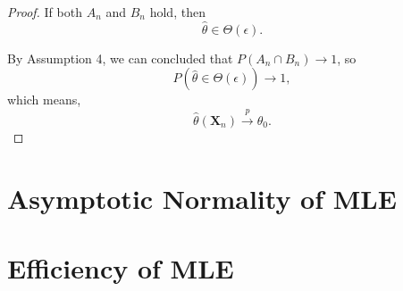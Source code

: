 \begin{proof}
    If both $A_{n}$ and $B_{n}$ hold, then
    \begin{equation*}
        \hat{\theta}\in\Theta(\epsilon).
    \end{equation*}
    
    By Assumption 4, we can concluded that $P\left(A_{n}\cap B_{n}\right)\rightarrow 1$, so
    \begin{equation*}
        P(\hat{\theta}\in\Theta(\epsilon))\rightarrow 1,
    \end{equation*}
    which means,
    \begin{equation*}
        \hat{\theta}\left(\textbf{X}_{n}\right)\stackrel{p}{\rightarrow}\theta_{0}.
    \end{equation*}
\end{proof}

\section{Asymptotic Normality of MLE}

\section{Efficiency of MLE}
